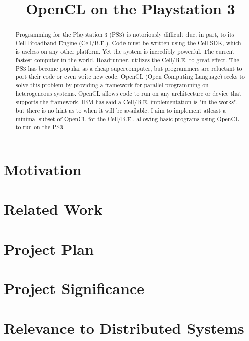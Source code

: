 \documentclass[conference]{IEEEtran}
\begin{document}
\title{OpenCL on the Playstation 3}

\author{
}

\maketitle

\begin{abstract}
Programming for the Playstation 3 (PS3) is notoriously difficult due, in part, to its Cell Broadband Engine (Cell/B.E.).
Code must be written using the Cell SDK, which is useless on any other platform. Yet the system is incredibly powerful.
The current fastest computer in the world, Roadrunner, utilizes the Cell/B.E. to great effect.
The PS3 has become popular as a cheap supercomputer, but programmers are reluctant to port their code or even write new code.
OpenCL (Open Computing Language) seeks to solve this problem by providing a framework for parallel programming on heterogeneous systems.
OpenCL allows code to run on any architecture or device that supports the framework.
IBM has said a Cell/B.E. implementation is "in the works", but there is no hint as to when it will be available.
I aim to implement atleast a minimal subset of OpenCL for the Cell/B.E., allowing basic programs using OpenCL to run on the PS3.

\end{abstract}

\section{Motivation}\label{sec:motivation}


\section{Related Work}


\section{Project Plan}


\section{Project Significance}


\section{Relevance to Distributed Systems}


%



\end{document}
